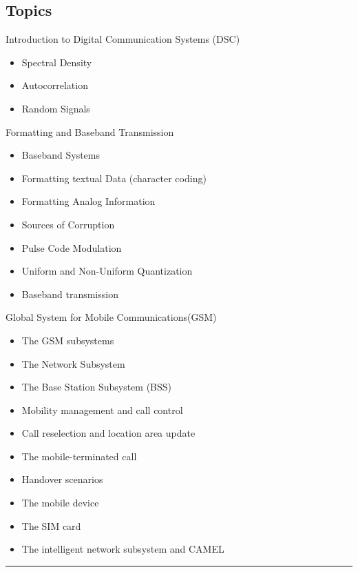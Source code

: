 \subsection*{Topics}
\begin{outline}
    \1 Introduction to Digital Communication Systems (DSC)
    \begin{itemize}
        \item Spectral Density
        \item Autocorrelation
        \item Random Signals
    \end{itemize}
    \1 Formatting and Baseband Transmission
    \begin{itemize}
        \item Baseband Systems
        \item Formatting textual Data (character coding)
        \item Formatting Analog Information
        \item Sources of Corruption
        \item Pulse Code Modulation
        \item Uniform and Non-Uniform Quantization
        \item Baseband transmission
    \end{itemize}
    \1 Global System for Mobile Communications(GSM)
    \begin{itemize}
        \item The GSM subsystems
        \item The Network Subsystem
        \item The Base Station Subsystem (BSS)
        \item Mobility management and call control
        \item Call reselection and location area update
        \item The mobile-terminated call
        \item Handover scenarios
        \item The mobile device
        \item The SIM card
        \item The intelligent network subsystem and CAMEL
    \end{itemize}
\end{outline}
\vspace{2ex} \hrule\vspace{2ex}

